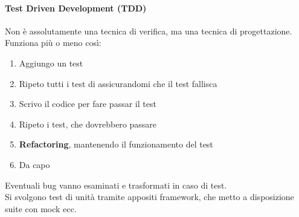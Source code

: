 \documentclass[a4paper,12pt]{article}
\begin{document}
\paragraph{Test Driven Development (TDD)}
Non è assolutamente una tecnica di verifica, ma una tecnica di progettazione.\\
Funziona più o meno così:
\begin{enumerate}
\item Aggiungo un test
\item Ripeto tutti i test di assicurandomi che il test fallisca
\item Scrivo il codice per fare passar il test
\item Ripeto i test, che dovrebbero passare
\item \textbf{Refactoring}, mantenendo il funzionamento del test
\item Da capo
\end{enumerate}
Eventuali bug vanno esaminati e trasformati in caso di test.\\ Si svolgono test di unità tramite appositi framework, che metto a disposizione suite con mock ecc.
\end{document}
